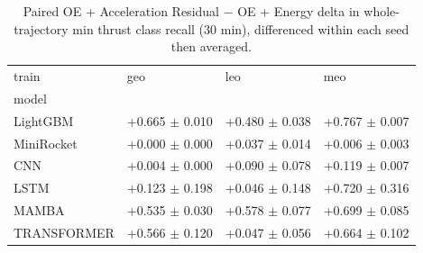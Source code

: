\begin{table}
\caption{Paired OE + Acceleration Residual $-$ OE + Energy delta in whole-trajectory min thrust class recall (30 min), differenced within each seed then averaged.}
\label{tab:total_featdelta_minrec_ladder}
\begin{tabular}{llll}
\toprule
train & geo & leo & meo \\
model &  &  &  \\
\midrule
LightGBM & +0.665 $\pm$ 0.010 & +0.480 $\pm$ 0.038 & +0.767 $\pm$ 0.007 \\
MiniRocket & +0.000 $\pm$ 0.000 & +0.037 $\pm$ 0.014 & +0.006 $\pm$ 0.003 \\
CNN & +0.004 $\pm$ 0.000 & +0.090 $\pm$ 0.078 & +0.119 $\pm$ 0.007 \\
LSTM & +0.123 $\pm$ 0.198 & +0.046 $\pm$ 0.148 & +0.720 $\pm$ 0.316 \\
MAMBA & +0.535 $\pm$ 0.030 & +0.578 $\pm$ 0.077 & +0.699 $\pm$ 0.085 \\
TRANSFORMER & +0.566 $\pm$ 0.120 & +0.047 $\pm$ 0.056 & +0.664 $\pm$ 0.102 \\
\bottomrule
\end{tabular}
\end{table}
